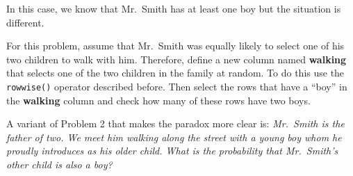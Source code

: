 \documentclass[
]{book}
\theoremstyle{definition}
\theoremstyle{definition}
\theoremstyle{definition}
\theoremstyle{definition}
\theoremstyle{remark}
\begin{document}
In this case, we know that Mr.~Smith has at least one boy but the situation is different.

For this problem, assume that Mr.~Smith was equally likely to select one of his two children to walk with him. Therefore, define a new column named \textbf{walking} that selects one of the two children in the family at random. To do this use the \texttt{rowwise()} operator described before. Then select the rows that have a ``boy'' in the \textbf{walking} column and check how many of these rows have two boys.

A variant of Problem 2 that makes the paradox more clear is: \emph{Mr.~Smith is the father of two. We meet him walking along the street with a young boy whom he proudly introduces as his older child. What is the probability that Mr.~Smith's other child is also a boy?}

  
\end{document}
